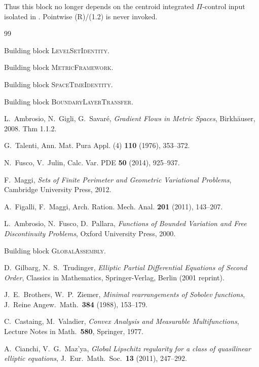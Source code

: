 \documentclass[11pt]{article}
\theoremstyle{definition}
\begin{document}
Thus this block no longer depends on the centroid integrated
\(\Pi\)-control input isolated in \cite{SpaceTimeIdentity}.  Pointwise
(R)/(1.2) is never invoked.

\begin{thebibliography}{99}

Building block \textsc{LevelSetIdentity}.

Building block \textsc{MetricFramework}.

Building block \textsc{SpaceTimeIdentity}.

Building block \textsc{BoundaryLayerTransfer}.

L.~Ambrosio, N.~Gigli, G.~Savar\'e, \emph{Gradient Flows in Metric
Spaces}, Birkh\"auser, 2008. Thm 1.1.2.

G.~Talenti, Ann. Mat. Pura Appl. (4) \textbf{110} (1976), 353--372.

N.~Fusco, V.~Julin, Calc. Var. PDE \textbf{50} (2014), 925--937.

F.~Maggi, \emph{Sets of Finite Perimeter and Geometric Variational
Problems}, Cambridge University Press, 2012.

A.~Figalli, F.~Maggi, Arch. Ration. Mech. Anal. \textbf{201} (2011),
143--207.

L.~Ambrosio, N.~Fusco, D.~Pallara, \emph{Functions of Bounded Variation
and Free Discontinuity Problems}, Oxford University Press, 2000.

Building block \textsc{GlobalAssembly}.

D.~Gilbarg, N.~S.~Trudinger,
\emph{Elliptic Partial Differential Equations of Second Order},
Classics in Mathematics, Springer-Verlag, Berlin (2001 reprint).

J.~E.~Brothers, W.~P.~Ziemer,
\emph{Minimal rearrangements of Sobolev functions},
J.\ Reine Angew.\ Math.\ \textbf{384} (1988), 153--179.

C.~Castaing, M.~Valadier,
\emph{Convex Analysis and Measurable Multifunctions},
Lecture Notes in Math.\ \textbf{580}, Springer, 1977.

A.~Cianchi, V.~G.~Maz'ya,
\emph{Global Lipschitz regularity for a class of quasilinear
elliptic equations}, J.~Eur.~Math.~Soc.\ \textbf{13} (2011), 247--292.

\end{thebibliography}
\end{document}
